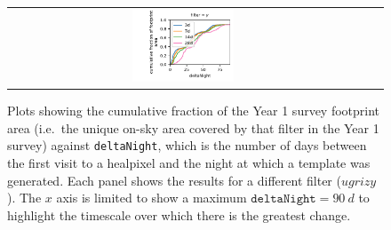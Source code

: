 \documentclass[preprintm,linenumbers]{aastex631}
\newcommand{\deltaNight}{\texttt{deltaNight}\xspace}
\begin{document}
\begin{figure}
\begin{tabular}{c c c}
				\includegraphics[width=0.3\textwidth]{results/first_year_one_snap_v4_0_10yrs_db_noDD_noTwi_doAllTemplateMetrics_reduceDeltaNight_y.pdf}
			\end{tabular}
			\caption{Plots showing the cumulative fraction of the Year 1 survey footprint area (i.e.\ the unique on-sky area covered by that filter in the Year 1 survey) against \deltaNight, which is the number of days between the first visit to a healpixel and the night at which a template was generated.
				Each panel shows the results for a different filter ($ugrizy$).
				The $x$ axis is limited to show a maximum $\deltaNight=90\ \si{d}$ to highlight the timescale over which there is the greatest change.
			}
			\label{fig:cumFrac_deltaNight}
		\end{figure}
  		
\end{document}
